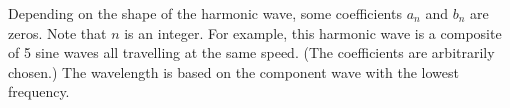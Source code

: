 Depending on the shape of the harmonic wave, some coefficients $a_n$ and $b_n$
are zeros. Note that $n$ is an integer. For example, this harmonic wave is a
composite of 5 sine waves all travelling at the same speed. (The coefficients
are arbitrarily chosen.) The wavelength is based on the component wave with the
lowest frequency.


%
%
%
%
